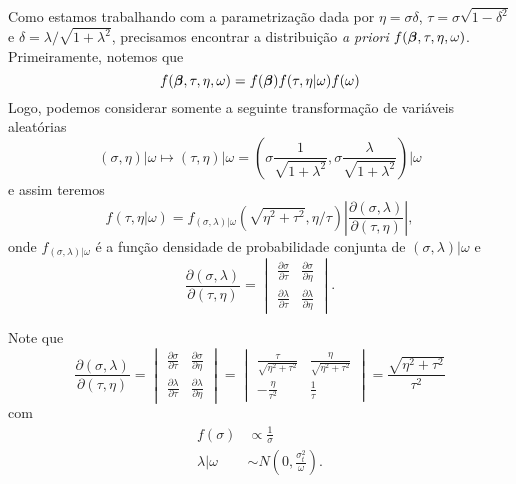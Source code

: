 Como estamos trabalhando com a parametrização dada por $\eta=\sigma\delta$, $\tau=\sigma\sqrt{1-\delta^2}$ e $\delta=\lambda/\sqrt{1+\lambda^2}$, 
precisamos encontrar a distribuição \textit{a priori} $f({\boldsymbol{\beta}},\tau,\eta,\omega)$. Primeiramente, notemos que
\begin{equation}
f({\boldsymbol{\beta}},\tau,\eta,\omega) = f({\boldsymbol{\beta}})f(\tau,\eta|\omega)f(\omega)
\end{equation}
Logo, podemos considerar somente a seguinte transformação de variáveis aleatórias
\begin{equation}
(\sigma,\eta)|\omega\mapsto(\tau,\eta)|\omega=\left(\sigma\frac{1}{\sqrt{1+\lambda^2}},\sigma\frac{\lambda}{\sqrt{1+\lambda^2}}\right)|\omega
\end{equation}
e assim teremos
\begin{equation}
f(\tau,\eta|\omega)=f_{(\sigma,\lambda)|\omega}(\sqrt{\eta^2+\tau^2},\eta/\tau)\left|\frac{\partial(\sigma,\lambda)}{\partial(\tau,\eta)}\right|,
\end{equation}
onde $f_{(\sigma,\lambda)|\omega}$ é a função densidade de probabilidade conjunta de $(\sigma,\lambda)|\omega$ e 
\begin{equation}
\frac{\partial(\sigma,\lambda)}{\partial(\tau,\eta)}=
\begin{vmatrix}
\frac{\partial \sigma}{\partial \tau} & \frac{\partial \sigma}{\partial \eta} \\
\frac{\partial \lambda}{\partial \tau} & \frac{\partial \lambda}{\partial \eta}
\end{vmatrix}.
\end{equation}

Note que
\begin{equation}
\frac{\partial(\sigma,\lambda)}{\partial(\tau,\eta)}=
\begin{vmatrix}
\frac{\partial \sigma}{\partial \tau} & \frac{\partial \sigma}{\partial \eta} \\
\frac{\partial \lambda}{\partial \tau} & \frac{\partial \lambda}{\partial \eta}
\end{vmatrix}=
\begin{vmatrix}
\frac{\tau}{\sqrt{\eta^2+\tau^2}} & \frac{\eta}{\sqrt{\eta^2+\tau^2}}\\
-\frac{\eta}{\tau^2} & \frac{1}{\tau}
\end{vmatrix}=\frac{\sqrt{\eta^2+\tau^2}}{\tau^2}
\end{equation}
com
\begin{equation}
\begin{split}
f(\sigma)&\propto\frac{1}{\sigma}\\
\lambda|\omega & \sim N\left(0,\frac{\sigma^2_t}{\omega}\right).
\end{split}
\end{equation}

